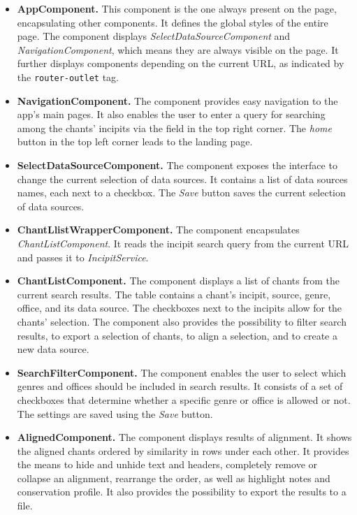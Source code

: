 \begin{itemize}

\item\textbf{AppComponent.} This component is the one always present on the page, encapsulating other components. It defines the global styles of the entire page.
The component displays \emph{SelectDataSourceComponent} and \emph{NavigationComponent}, which means they are always visible on the page. It further displays
components depending on the current URL, as indicated by the \verb|router-outlet| tag.

\item\textbf{NavigationComponent.} The component provides easy navigation to the app's main pages. It also enables the user to enter a query for searching
among the chants' incipits via the field in the top right corner. The \emph{home} button in the top left corner leads to the landing page.

\item\textbf{SelectDataSourceComponent.} The component exposes the interface to change the current selection of data sources. It contains a list of data sources
names, each next to a checkbox. The \emph{Save} button saves the current selection of data sources.

\item\textbf{ChantLlistWrapperComponent.} The component encapsulates \emph{ChantListComponent}. It reads the incipit search query from the current URL and
passes it to \emph{IncipitService}.

\item\textbf{ChantListComponent.} The component displays a list of chants from the current search results. The table contains a chant's incipit, source, genre, office, and
its data source. The checkboxes next to the incipits allow for the chants' selection. The component also provides the possibility to filter search
results, to export a selection of chants, to align a selection, and to create a new data source.

\item\textbf{SearchFilterComponent.} The component enables the user to select which genres and offices should be included in search results. It consists of
a set of checkboxes that determine whether a specific genre or office is allowed or not. The settings are saved using the \emph{Save} button.

\item\textbf{AlignedComponent.} The component displays results of alignment. It shows the aligned chants ordered by similarity in rows under each other. It
provides the means to hide and unhide text and headers, completely remove or collapse an alignment, rearrange the order, as well as highlight notes and
conservation profile. It also provides the possibility to export the results to a file.


\end{itemize}

